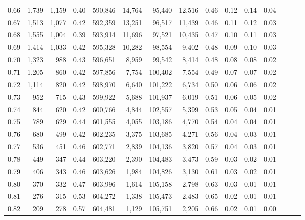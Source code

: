 \begin{tabular}{rrrrrrrrrrrrrrr}
0.66 &   1,739 &  1,159 &  0.40 &  590,846 &   14,764 &   95,440 &   12,516 &  0.46 &  0.12 &  0.14 &      0.04 \\
0.67 &   1,513 &  1,077 &  0.42 &  592,359 &   13,251 &   96,517 &   11,439 &  0.46 &  0.11 &  0.12 &      0.03 \\
0.68 &   1,555 &  1,004 &  0.39 &  593,914 &   11,696 &   97,521 &   10,435 &  0.47 &  0.10 &  0.11 &      0.03 \\
0.69 &   1,414 &  1,033 &  0.42 &  595,328 &   10,282 &   98,554 &    9,402 &  0.48 &  0.09 &  0.10 &      0.03 \\
0.70 &   1,323 &    988 &  0.43 &  596,651 &    8,959 &   99,542 &    8,414 &  0.48 &  0.08 &  0.08 &      0.02 \\
0.71 &   1,205 &    860 &  0.42 &  597,856 &    7,754 &  100,402 &    7,554 &  0.49 &  0.07 &  0.07 &      0.02 \\
0.72 &   1,114 &    820 &  0.42 &  598,970 &    6,640 &  101,222 &    6,734 &  0.50 &  0.06 &  0.06 &      0.02 \\
0.73 &     952 &    715 &  0.43 &  599,922 &    5,688 &  101,937 &    6,019 &  0.51 &  0.06 &  0.05 &      0.02 \\
0.74 &     844 &    620 &  0.42 &  600,766 &    4,844 &  102,557 &    5,399 &  0.53 &  0.05 &  0.04 &      0.01 \\
0.75 &     789 &    629 &  0.44 &  601,555 &    4,055 &  103,186 &    4,770 &  0.54 &  0.04 &  0.04 &      0.01 \\
0.76 &     680 &    499 &  0.42 &  602,235 &    3,375 &  103,685 &    4,271 &  0.56 &  0.04 &  0.03 &      0.01 \\
0.77 &     536 &    451 &  0.46 &  602,771 &    2,839 &  104,136 &    3,820 &  0.57 &  0.04 &  0.03 &      0.01 \\
0.78 &     449 &    347 &  0.44 &  603,220 &    2,390 &  104,483 &    3,473 &  0.59 &  0.03 &  0.02 &      0.01 \\
0.79 &     406 &    343 &  0.46 &  603,626 &    1,984 &  104,826 &    3,130 &  0.61 &  0.03 &  0.02 &      0.01 \\
0.80 &     370 &    332 &  0.47 &  603,996 &    1,614 &  105,158 &    2,798 &  0.63 &  0.03 &  0.01 &      0.01 \\
0.81 &     276 &    315 &  0.53 &  604,272 &    1,338 &  105,473 &    2,483 &  0.65 &  0.02 &  0.01 &      0.01 \\
0.82 &     209 &    278 &  0.57 &  604,481 &    1,129 &  105,751 &    2,205 &  0.66 &  0.02 &  0.01 &      0.00 \\

\end{tabular}

